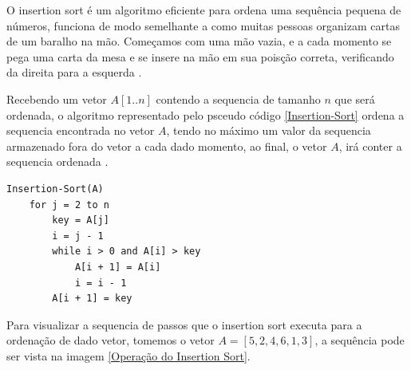 \documentclass[
	12pt,				%
	openright,			%
	oneside,			%
	a4paper,			%
	english,			%
	brazil				%
	]{abntex2}
\begin{document}
O insertion sort é um algoritmo eficiente para ordena uma sequência pequena de números, funciona de modo semelhante a
como muitas pessoas organizam cartas de um baralho na mão. Começamos com uma mão vazia, e a cada momento se pega uma
carta da mesa e se insere na mão em sua poisção correta, verificando da direita para a esquerda \cite{introductionAlgorthms}.

Recebendo um vetor $A[1..n]$ contendo a sequencia de tamanho $n$ que será ordenada,  o algoritmo representado pelo
psceudo código \ref{Insertion-Sort} ordena a sequencia encontrada no vetor $A$, tendo no máximo um valor da sequencia 
armazenado fora do vetor a cada dado momento, ao final, o vetor $A$, irá conter a sequencia ordenada \cite{introductionAlgorthms}.

\lstset{style=psceudo}
\begin{lstlisting}[caption={\label{Insertion-Sort}Insertion-Sort}]
	Insertion-Sort(A)
	for j = 2 to n
		key = A[j]
		i = j - 1
		while i > 0 and A[i] > key
			A[i + 1] = A[i]
			i = i - 1
		A[i + 1] = key	
\end{lstlisting}

Para visualizar a sequencia de passos que o insertion sort executa para a ordenação de dado vetor, 
tomemos o vetor $A = [5, 2, 4, 6, 1, 3]$, a sequência pode ser vista na imagem \ref{Operação do Insertion Sort}.
\end{document}
